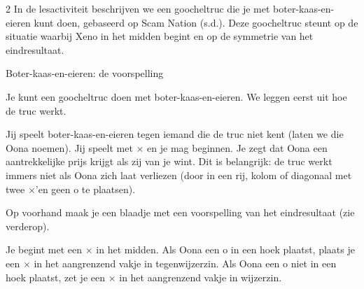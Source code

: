 \begin{multicols}{2}
In de lesactiviteit beschrijven we een goocheltruc die je met boter-kaas-en-eieren kunt doen, gebaseerd op Scam Nation (s.d.). Deze goocheltruc steunt op de situatie waarbij Xeno in het midden begint en op de symmetrie van het eindresultaat.

\end{multicols}

\begin{lesactiviteit}{Boter-kaas-en-eieren: de voorspelling}

Je kunt een goocheltruc doen met boter-kaas-en-eieren. We leggen eerst uit hoe de truc werkt.

Jij speelt boter-kaas-en-eieren tegen iemand die de truc niet kent (laten we die Oona noemen). Jij speelt met $\times$ en je mag beginnen. Je zegt dat Oona een aantrekkelijke prijs krijgt als zij van je wint. Dit is belangrijk: de truc werkt immers niet als Oona zich laat verliezen (door in een rij, kolom of diagonaal met twee $\times$'en geen o te plaatsen).

Op voorhand maak je een blaadje met een voorspelling van het eindresultaat (zie verderop).

Je begint met een $\times$ in het midden. Als Oona een o in een hoek plaatst, plaats je een $\times$ in het aangrenzend vakje in tegenwijzerzin. Als Oona een o niet in een hoek plaatst, zet je een $\times$ in het aangrenzend vakje in wijzerzin. 


\end{lesactiviteit}
